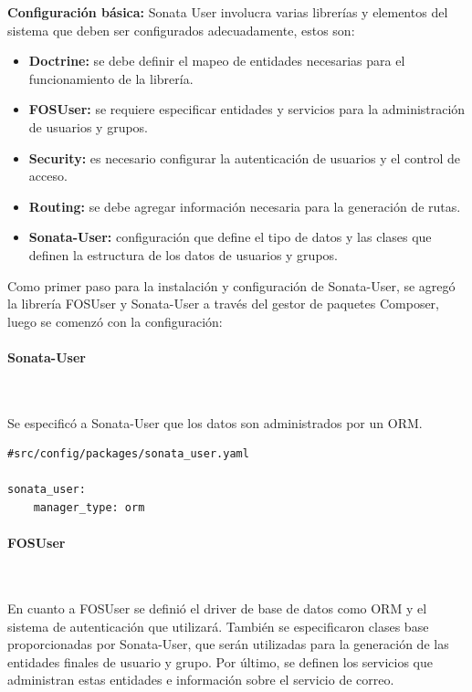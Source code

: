 \newpage
\textbf{Configuración básica:} Sonata User involucra varias librerías y elementos del sistema que deben ser configurados adecuadamente, estos son:

\begin{itemize}
    \item \textbf{Doctrine:} se debe definir el mapeo de entidades necesarias para el funcionamiento de la librería.
    \item \textbf{FOSUser:} se requiere especificar entidades y servicios para la administración de usuarios y grupos.
    \item \textbf{Security:} es necesario configurar la autenticación de usuarios y el control de acceso.
    \item \textbf{Routing:} se debe agregar información necesaria para la generación de rutas.
    \item \textbf{Sonata-User:} configuración que define el tipo de datos y las clases que definen la estructura de los datos de usuarios y grupos.
\end{itemize}



Como primer paso para la instalación y configuración de Sonata-User, se agregó la librería FOSUser y Sonata-User a través del gestor de paquetes Composer,
luego se comenzó con la configuración:

\paragraph{Sonata-User}~\newline

Se especificó a Sonata-User que los datos son administrados por un ORM.

\begin{lstlisting}[caption={archivo de configuración de sonata-user\\Fuente: \sonatainstallation.}]
#src/config/packages/sonata_user.yaml

sonata_user:
    manager_type: orm

\end{lstlisting}

\newpage \paragraph{FOSUser}~\newline

En cuanto a FOSUser se definió el driver de base de datos como ORM y el sistema de autenticación que utilizará\@. También se especificaron clases base
proporcionadas por Sonata-User, que serán utilizadas para la generación de las entidades finales de usuario y grupo\@. Por último, se definen los servicios
que administran estas entidades e información sobre el servicio de correo.

